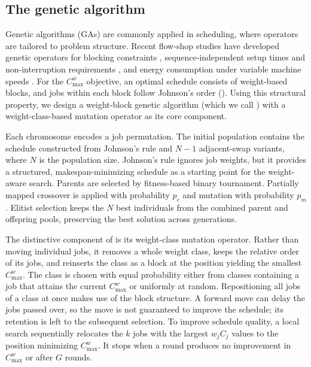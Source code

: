 ﻿\documentclass[12pt]{article} \textheight=24.5cm \textwidth=16.5cm \parskip = 0.165cm
\begin{document}
\begin{sloppypar}
        \subsection{The genetic algorithm} \label{sec:ga}
        
        Genetic algorithms (GAs) are commonly applied in scheduling, where operators are tailored to problem structure. Recent flow-shop studies have developed genetic operators for blocking constraints \citep{deAthaydePrataFuchigami2024JIM},  sequence-independent setup times and non-interruption requirements \citep{QiaoWuHeLi2022ESA}, and energy consumption under variable machine speeds \citep{WangWang2023EAAI}. For the $C_{\max}^w$ objective, an optimal schedule consists of weight-based blocks, and jobs within each block follow Johnson's order (). Using this structural property, we design a weight-block genetic algorithm (which we call ) with a weight-class-based mutation operator as its core component.
        
        Each chromosome encodes a job permutation. The initial population contains the schedule constructed from Johnson's rule  and $N-1$ adjacent-swap variants, where $N$ is the population size. Johnson's rule ignores job weights, but it provides a structured, makespan-minimizing schedule as a starting point for the weight-aware search. Parents are selected by fitness-based binary tournament. Partially mapped crossover is applied with probability $p_c$ and mutation with probability $p_m$. Elitist selection keeps the $N$ best individuals from the combined parent and offspring pools, preserving the best solution across generations.
        
        The distinctive component of  is its weight-class mutation operator. Rather than moving individual jobs, it removes a whole weight class, keeps the relative order of its jobs, and reinserts the class as a block at the position yielding the smallest $C_{\max}^w$. The class is chosen with equal probability either from classes containing a job that attains the current $C_{\max}^w$ or uniformly at random. Repositioning all jobs of a class at once makes use of the block structure. A forward move can delay the jobs passed over, so the move is not guaranteed to improve the schedule; its retention is left to the subsequent selection. To improve schedule quality, a local search sequentially relocates the $k$ jobs with the largest $w_j C_j$ values to the position minimizing $C_{\max}^w$. It stops when a round produces no improvement in $C_{\max}^w$ or after $G$ rounds. 


\end{sloppypar}
\end{document}

